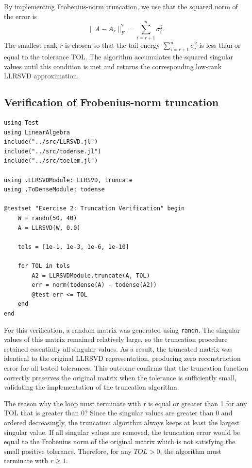 \documentclass[11pt]{report}
\begin{document}
By implementing Frobenius-norm truncation, we use that the squared norm of the error is 
\[
\|A - A_r\|_F^2 = \sum_{i=r+1}^n \sigma_i^2.
\]
The smallest rank $r$ is chosen so that the tail energy 
$\sum_{i=r+1}^n \sigma_i^2$ is less than or equal to the tolerance TOL. 
The algorithm accumulates the squared singular values until this condition 
is met and returns the corresponding low-rank LLRSVD approximation.


\subsection{Verification of Frobenius-norm truncation}

\begin{lstlisting}
using Test
using LinearAlgebra
include("../src/LLRSVD.jl")
include("../src/todense.jl")
include("../src/toelem.jl")

using .LLRSVDModule: LLRSVD, truncate
using .ToDenseModule: todense

@testset "Exercise 2: Truncation Verification" begin
    W = randn(50, 40)
    A = LLRSVD(W, 0.0)

    tols = [1e-1, 1e-3, 1e-6, 1e-10]

    for TOL in tols
        A2 = LLRSVDModule.truncate(A, TOL)
        err = norm(todense(A) - todense(A2))
        @test err <= TOL
    end
end
\end{lstlisting}

For this verification, a random matrix was generated using
\texttt{randn}. The singular values of this matrix remained relatively
large, so the truncation procedure retained essentially all singular
values. As a result, the truncated matrix was identical to the original
LLRSVD representation, producing zero reconstruction error for all
tested tolerances. This outcome confirms that the truncation function correctly preserves the
original matrix when the tolerance is sufficiently small, validating the implementation of the truncation algorithm.

\vspace{2em}
The reason why the loop must terminate with r is equal or greater than 1 for any TOL that is greater than 0? Since the singular values are greater than 0 and ordered decreasingly, the truncation algorithm always keeps at least the largest singular value. If all singular values are removed, the truncation error would be equal to the Frobenius norm of the original matrix which is not satisfying the small positive tolerance. Therefore, for any $TOL > 0$, the algorithm must terminate
with $r \geq 1$.
\end{document}
